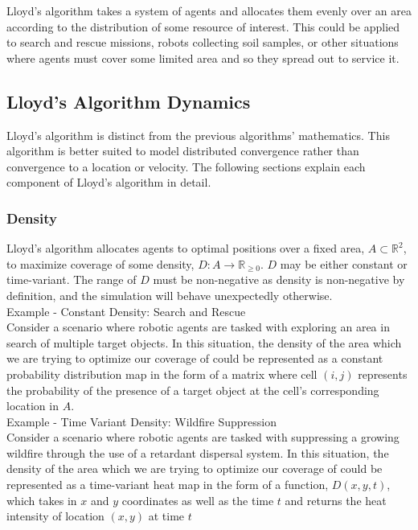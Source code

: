\documentclass[../CourseManual.tex]{subfiles}
\begin{document}
Lloyd's algorithm takes a system of agents and allocates them evenly over an area according to the distribution of some resource of interest. This could be applied to search and rescue missions, robots collecting soil samples, or other situations where agents must cover some limited area and so they spread out to service it. 
\subsection{Lloyd's Algorithm Dynamics} \label{Lloyd Dynamics}
Lloyd's algorithm is distinct from the previous algorithms' mathematics. This algorithm is better suited to model distributed convergence rather than convergence to a location or velocity. The following sections explain each component of Lloyd's algorithm in detail.

\subsubsection{Density} \label{Lloyd Density}
Lloyd’s algorithm allocates agents to optimal positions over a fixed area, $A \subset \mathbb{R}^2$, to maximize coverage of some density, $D : A \rightarrow \mathbb{R}_{\geq0}$. $D$ may be either constant or time-variant. The range of $D$ must be non-negative as density is non-negative by definition, and the simulation will behave unexpectedly otherwise. \\

Example - Constant Density: Search and Rescue \\

Consider a scenario where robotic agents are tasked with exploring an area in search of multiple target objects. In this situation, the density of the area which we are trying to optimize our coverage of could be represented as a constant probability distribution map in the form of a matrix where cell $(i,j)$ represents the probability of the presence of a target object at the cell's corresponding location in $A$. \\ 

Example - Time Variant Density: Wildfire Suppression \\

Consider a scenario where robotic agents are tasked with suppressing a growing wildfire through the use of a retardant dispersal system. In this situation, the density of the area which we are trying to optimize our coverage of could be represented as a time-variant heat map in the form of a function, $D(x,y,t)$, which takes in $x$ and $y$ coordinates as well as the time $t$ and returns the heat intensity of location $(x,y)$ at time $t$ \\
\end{document}
